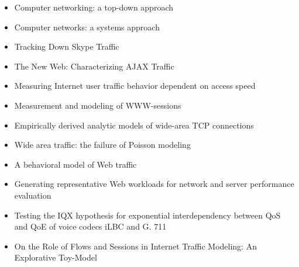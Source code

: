 \begin{itemize}
\item Computer networking: a top-down approach \cite{kurose2008computer}
\item Computer networks: a systems approach \cite{peterson2007computer}

\item Tracking Down Skype Traffic \cite{4509656}
\item The New Web: Characterizing AJAX Traffic \cite{characterizeajax2008}
\item Measuring Internet user traffic behavior dependent on access speed \cite{vicari1999measuring}
\item Measurement and modeling of WWW-sessions \cite{vicari1997measurement}
\item Empirically derived analytic models of wide-area TCP connections \cite{Paxson:1994:EDA:189520.189525}
\item Wide area traffic: the failure of Poisson modeling \cite{Paxson:1995:WAT:208389.208390}
\item A behavioral model of Web traffic \cite{801961}
\item Generating representative Web workloads for network and server performance evaluation \cite{Barford:1998:GRW:277851.277897}
\item Testing the IQX hypothesis for exponential interdependency between QoS and QoE of voice codecs iLBC and G. 711 \cite{hossfeld2008testing}
\item On the Role of Flows and Sessions in Internet Traffic Modeling: An Explorative Toy-Model \cite{5425847}
\end{itemize}


